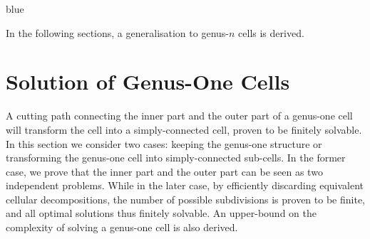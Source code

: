 \documentclass[Afour,sageh,times]{sagej}
\begin{document}
\begin{color}{blue}

In the following sections, a generalisation to genus-$n$ cells is derived.
\end{color}

\section{Solution of Genus-One Cells}
\label{section_genus_one}
\noindent
\indent
A cutting path connecting the inner part and the outer part of a genus-one cell will transform the cell into a 
simply-connected cell, proven to be finitely solvable. 
In this section we consider two cases: keeping the genus-one structure or transforming the genus-one cell into 
simply-connected sub-cells. In the former case, we prove that the inner part and the outer part can be seen as two independent problems. 
While in the later case, by efficiently discarding equivalent cellular decompositions, the number of possible subdivisions is proven to be finite, 
and all optimal solutions thus finitely solvable. An upper-bound on the complexity of solving a genus-one cell is also derived.  
\end{document}
